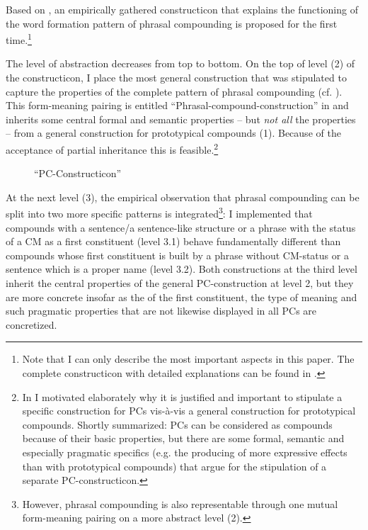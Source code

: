 \documentclass[output=paper]{LSP/langsci}
\begin{document}
Based on , an empirically gathered constructicon that explains the functioning of the word formation pattern of phrasal compounding is proposed for the first time.\footnote{Note that I can only describe the most important aspects in this paper. The complete constructicon with detailed explanations can be found in \citealt[Chapter III.3.1.4]{Hein2015}.} 

{The level of abstraction} {decreases from} {top to bottom.} On the top of level (2) of the constructicon, I place the most general construction that was stipulated to capture the properties of the complete pattern of phrasal compounding (cf. ). This form-meaning pairing is entitled ``Phrasal-compound-construction'' in  and inherits some central formal and semantic properties -- but \textit{not all} the properties -- from a general construction for prototypical  compounds (1). Because of the acceptance of partial inheritance this is feasible.\footnote{In \citealt[Chapter II.2.2.2]{Hein2015} I motivated elaborately why it is justified and important to stipulate a specific construction for PCs vis-à-vis a general construction for prototypical  compounds. Shortly summarized: PCs can be considered as  compounds because of their basic  properties, but there are some formal, semantic and especially pragmatic specifics (e.g. the producing of more expressive effects than with prototypical  compounds) that argue for the stipulation of a separate PC-constructicon.} 

 
\begin{sidewaysfigure}

\caption{``PC-Constructicon''}
\label{fig:hein:3}
\end{sidewaysfigure}


At the next level (3), the empirical observation that phrasal compounding can be split into two more specific patterns is integrated\footnote{However, phrasal compounding is also representable through one mutual form-meaning pairing on a more abstract level (2).}: I implemented that compounds with a sentence\slash a sentence-like structure or a phrase with the status of a CM as a first constituent (level 3.1) behave fundamentally different than compounds whose first constituent is built by a phrase without CM-status or a sentence which is a proper name (level 3.2). Both constructions at the third level inherit the central properties of the general PC-construction at level 2, but they are more concrete insofar as the  of the first constituent, the type of meaning and such pragmatic properties that are not likewise displayed in all PCs are concretized. 
\end{document}
